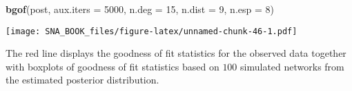\documentclass[]{book}
\newenvironment{Shaded}{\begin{snugshade}}{\end{snugshade}}
\newcommand{\KeywordTok}[1]{\textcolor[rgb]{0.13,0.29,0.53}{\textbf{{#1}}}}
\newcommand{\DataTypeTok}[1]{\textcolor[rgb]{0.13,0.29,0.53}{{#1}}}
\newcommand{\DecValTok}[1]{\textcolor[rgb]{0.00,0.00,0.81}{{#1}}}
\newcommand{\NormalTok}[1]{{#1}}
\begin{document}
\begin{Shaded}
\begin{Highlighting}[]
\KeywordTok{bgof}\NormalTok{(post, }\DataTypeTok{aux.iters =} \DecValTok{5000}\NormalTok{, }\DataTypeTok{n.deg =} \DecValTok{15}\NormalTok{, }\DataTypeTok{n.dist =} \DecValTok{9}\NormalTok{, }\DataTypeTok{n.esp =} \DecValTok{8}\NormalTok{)}
\end{Highlighting}
\end{Shaded}

\texttt{[image: SNA\_BOOK\_files/figure-latex/unnamed-chunk-46-1.pdf]}

The red line displays the goodness of fit statistics for the observed
data together with boxplots of goodness of fit statistics based on
\(100\) simulated networks from the estimated posterior distribution.


\end{document}
